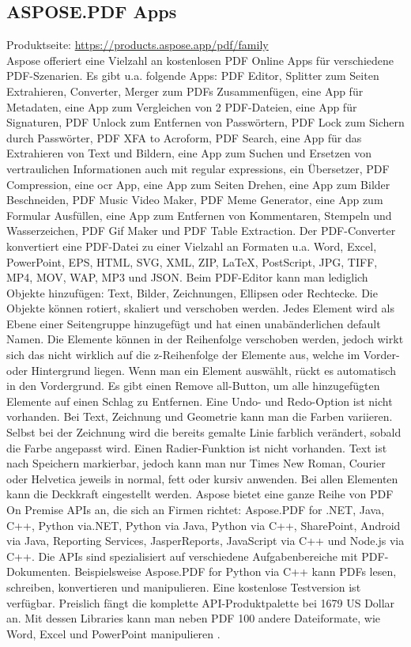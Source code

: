 \subsection{ASPOSE.PDF Apps}
Produktseite: \url{https://products.aspose.app/pdf/family} \\
Aspose offeriert eine Vielzahl an kostenlosen PDF Online Apps für verschiedene PDF-Szenarien. Es gibt u.a. folgende Apps: PDF Editor, Splitter zum Seiten Extrahieren, Converter, Merger zum PDFs Zusammenfügen, eine App für Metadaten, eine App zum Vergleichen von 2 PDF-Dateien, eine App für Signaturen, PDF Unlock zum Entfernen von Passwörtern, PDF Lock zum Sichern durch Passwörter, PDF XFA to Acroform, PDF Search, eine App für das Extrahieren von Text und Bildern, eine App zum Suchen und Ersetzen von vertraulichen Informationen auch mit regular expressions, ein Übersetzer, PDF Compression, eine \gls{ocr} App, eine App zum Seiten Drehen, eine App zum Bilder Beschneiden, PDF Music Video Maker, PDF Meme Generator, eine App zum Formular Ausfüllen, eine App zum Entfernen von Kommentaren, Stempeln und Wasserzeichen, PDF Gif Maker und PDF Table Extraction. Der PDF-Converter konvertiert eine PDF-Datei zu einer Vielzahl an Formaten u.a. Word, Excel, PowerPoint, EPS, HTML, SVG, XML, ZIP, LaTeX, PostScript, JPG, TIFF, MP4, MOV, WAP, MP3 und JSON. Beim PDF-Editor kann man lediglich Objekte hinzufügen: Text, Bilder, Zeichnungen, Ellipsen oder Rechtecke. Die Objekte können rotiert, skaliert und verschoben werden. Jedes Element wird als Ebene einer Seitengruppe hinzugefügt und hat einen unabänderlichen default Namen. Die Elemente können in der Reihenfolge verschoben werden, jedoch wirkt sich das nicht wirklich auf die z-Reihenfolge der Elemente aus, welche im Vorder- oder Hintergrund liegen. Wenn man ein Element auswählt, rückt es automatisch in den Vordergrund. Es gibt einen Remove all-Button, um alle hinzugefügten Elemente auf einen Schlag zu Entfernen. Eine Undo- und Redo-Option ist nicht vorhanden. Bei Text, Zeichnung und Geometrie kann man die Farben variieren. Selbst bei der Zeichnung wird die bereits gemalte Linie farblich verändert, sobald die Farbe angepasst wird. Einen Radier-Funktion ist nicht vorhanden. Text ist nach Speichern markierbar, jedoch kann man nur Times New Roman, Courier oder Helvetica jeweils in normal, fett oder kursiv anwenden. Bei allen Elementen kann die Deckkraft eingestellt werden. Aspose bietet eine ganze Reihe von PDF On Premise APIs an, die sich an Firmen richtet: Aspose.PDF for .NET, Java, C++, Python via.NET, Python via Java, Python via C++, SharePoint, Android via Java, Reporting Services, JasperReports, JavaScript via C++ und Node.js via C++. Die APIs sind spezialisiert auf verschiedene Aufgabenbereiche mit PDF-Dokumenten. Beispielsweise Aspose.PDF for Python via C++ kann PDFs lesen, schreiben, konvertieren und manipulieren. Eine kostenlose Testversion ist verfügbar. Preislich fängt die komplette API-Produktpalette bei 1679 US Dollar an. Mit dessen Libraries kann man neben PDF 100 andere Dateiformate, wie Word, Excel und PowerPoint manipulieren \cite{aspose-api}.

